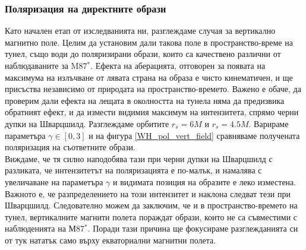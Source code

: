 \subsubsection{Поляризация на директните образи}
Като начален етап от изследванията ни, разглеждаме случая за вертикално магнитно поле. Целим да установим дали такова поле в пространство-време на тунел, също води до поляризирани образи, които са качествено различни от наблюдаваните за M87$^*$. Ефекта на аберацията, отговорен за появата на максимума на излъчване от лявата страна на образа е чисто кинематичен, и ще присъства независимо от природата на пространство-времето. Важено е обаче, да проверим дали ефекта на лещата в околността на тунела няма да предизвика обратният ефект, и да измести видимия максимум на интензитета, спрямо черни дупки на Шварцшилд. Разглеждаме орбитите $r_s = 6M$ и $r_s = 4.5M$. Варираме параметъра $\gamma\in[0,3]$ и на фигура \ref{WH_pol_vert_field} сравняваме получената поляризация на съответните образи.\\

Виждаме, че тя силно наподобява тази при черни дупки на Шварцшилд с разликата, че интензитетът на поляризацията е по-малък, и намалява с увеличаване на параметъра $\gamma$ и видимата позиция на образите е леко изместена. Важното е, че разпределението на този интензитет и наклона следват тези при Шварцшилд. Следователно можем да заключим, че и в пространство-времето на тунел, вертикалните магнити полета пораждат образи, които не са съвместими с наблюденията на М87$^*$. Поради тази причина ще фокусираме разглежданията си от тук нататък само върху екваториални магнитни полета. \newpage

